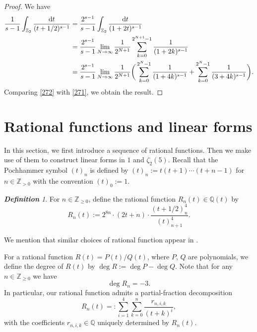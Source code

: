 \documentclass[12pt]{article}
\let\ge\geqslant
\renewcommand{\d}{\mathrm{d}}
\theoremstyle{remark}
\newtheorem{definition}[theorem]{\bf Definition}
\numberwithin{equation}{section}
\begin{document}
\begin{proof}
We have
\begin{align}
\frac{1}{s-1}\int_{\mathbb{Z}_2} \frac{\d t}{(t+1/2)^{s-1}}
&= \frac{2^{s-1}}{s-1} \int_{\mathbb{Z}_2} \frac{\d t}{(1+2t)^{s-1}} \notag\\
&= \frac{2^{s-1}}{s-1} \lim_{N \to \infty} \frac{1}{2^{N+1}} \sum_{k=0}^{2^{N+1}-1} \frac{1}{(1+2k)^{s-1}} \notag\\
&= \frac{2^{s-1}}{s-1} \lim_{N \to \infty} \frac{1}{2^{N+1}}\bigg( \sum_{k=0}^{2^N-1} \frac{1}{(1+4k)^{s-1}} + \sum_{k=0}^{2^N-1} \frac{1}{(3+4k)^{s-1}} \bigg).
\label{272}
\end{align}
Comparing \eqref{272} with \eqref{271}, we obtain the result.
\end{proof}

\section{Rational functions and linear forms}

In this section, we first introduce a sequence of rational functions. 
Then we make use of them to construct linear forms in $1$ and $\zeta_2(5)$. 
Recall that the Pochhammer symbol $(t)_n$ is defined by $(t)_{n}:=t(t+1)\cdots(t+n-1)$ for $n \in \mathbb{Z}_{>0}$ with the convention $(t)_0:= 1$.

\begin{definition}
\label{def_R_n(t)}
For $n \in \mathbb{Z}_{\ge0}$, define the rational function $R_n(t) \in \mathbb{Q}(t)$ by
\[ 
R_n(t) :=  2^{8n} \cdot (2t+n) \cdot \frac{(t+1/2)_n^4}{(t)_{n+1}^4}. 
\]
\end{definition}  

We mention that similar choices of rational function appear in \cite{Bel2019,Lai2025,Riv2017+}. 

For a rational function $R(t)=P(t)/Q(t)$, where $P$, $Q$ are polynomials, we define the degree of $R(t)$ by $\deg R := \deg P - \deg Q$. 
Note that for any $n \in \mathbb{Z}_{\ge0}$ we have 
\begin{equation}\label{deg_R=-3}
\deg R_n = -3. 
\end{equation}
In particular, our rational function admits a partial-fraction decomposition
\begin{equation}
\label{def_rik}
R_n(t) =: \sum_{i=1}^{4}\sum_{k=0}^{n} \frac{r_{n,i,k}}{(t+k)^i},
\end{equation}
with the coefficients $r_{n,i,k} \in \mathbb{Q}$ uniquely determined by $R_n(t)$. 
\end{document}
